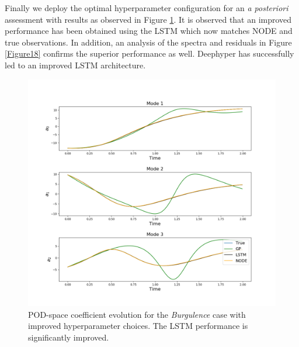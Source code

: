 \documentclass[preprint,12pt]{elsarticle}
\begin{document}
Finally we deploy the optimal hyperparameter configuration for an \emph{a posteriori} assessment with results as observed in Figure \ref{Figure17}. It is observed that an improved performance has been obtained using the LSTM which now matches NODE and true observations. In addition, an analysis of the spectra and residuals in Figure \ref{Figure18} confirms the superior performance as well. Deephyper has successfully led to an improved LSTM architecture.


\begin{figure}
	\centering
	\includegraphics[width=\textwidth]{Figure_22.pdf}
	\caption{POD-space coefficient evolution for the \emph{Burgulence} case with improved hyperparameter choices. The LSTM performance is significantly improved.}
	\label{Figure17}
\end{figure}
\end{document}
